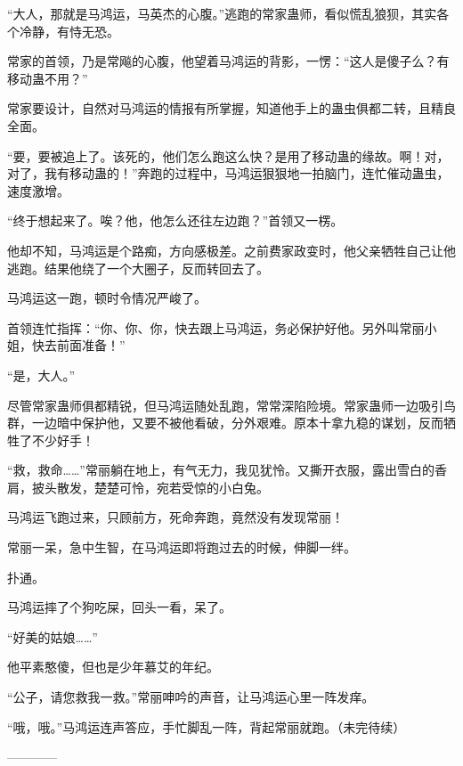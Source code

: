 \begin{this_body}
“大人，那就是马鸿运，马英杰的心腹。”逃跑的常家蛊师，看似慌乱狼狈，其实各个冷静，有恃无恐。

常家的首领，乃是常飚的心腹，他望着马鸿运的背影，一愣：“这人是傻子么？有移动蛊不用？”

常家要设计，自然对马鸿运的情报有所掌握，知道他手上的蛊虫俱都二转，且精良全面。

“要，要被追上了。该死的，他们怎么跑这么快？是用了移动蛊的缘故。啊！对，对了，我有移动蛊的！”奔跑的过程中，马鸿运狠狠地一拍脑门，连忙催动蛊虫，速度激增。

“终于想起来了。唉？他，他怎么还往左边跑？”首领又一楞。

他却不知，马鸿运是个路痴，方向感极差。之前费家政变时，他父亲牺牲自己让他逃跑。结果他绕了一个大圈子，反而转回去了。

马鸿运这一跑，顿时令情况严峻了。

首领连忙指挥：“你、你、你，快去跟上马鸿运，务必保护好他。另外叫常丽小姐，快去前面准备！”

“是，大人。”

尽管常家蛊师俱都精锐，但马鸿运随处乱跑，常常深陷险境。常家蛊师一边吸引鸟群，一边暗中保护他，又要不被他看破，分外艰难。原本十拿九稳的谋划，反而牺牲了不少好手！

“救，救命……”常丽躺在地上，有气无力，我见犹怜。又撕开衣服，露出雪白的香肩，披头散发，楚楚可怜，宛若受惊的小白兔。

马鸿运飞跑过来，只顾前方，死命奔跑，竟然没有发现常丽！

常丽一呆，急中生智，在马鸿运即将跑过去的时候，伸脚一绊。

扑通。

马鸿运摔了个狗吃屎，回头一看，呆了。

“好美的姑娘……”

他平素憨傻，但也是少年慕艾的年纪。

“公子，请您救我一救。”常丽呻吟的声音，让马鸿运心里一阵发痒。

“哦，哦。”马鸿运连声答应，手忙脚乱一阵，背起常丽就跑。（未完待续）

------------

\end{this_body}

